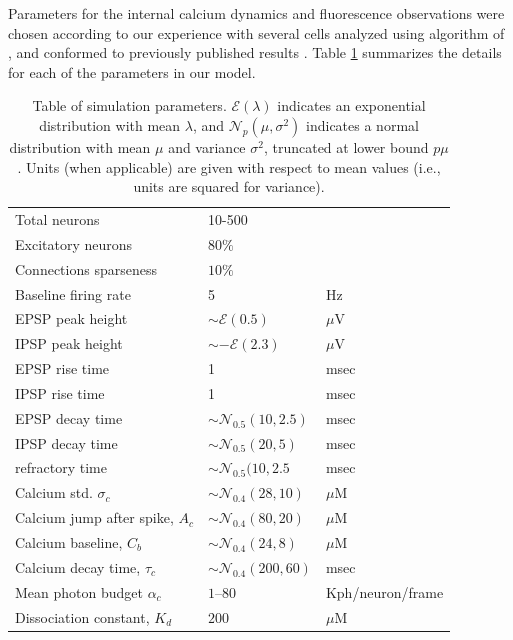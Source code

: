 Parameters for the internal calcium dynamics and fluorescence observations were chosen according to our experience with several cells analyzed using algorithm of \cite{Vogelstein2009}, and conformed to previously published results \cite{ImagingManual,HelmchenSakmann96,BrenowitzRegehr07}. %
Table \ref{table:caparm} summarizes the details for each of the parameters in our model.

\begin{table}[h!b!p!]
\caption{Table of simulation parameters. $\mathcal{E}(\lambda)$ indicates an exponential distribution with mean $\lambda$, and $\mathcal{N}_p(\mu,\sigma^2)$ indicates a normal distribution with mean $\mu$ and variance $\sigma^2$, truncated at lower bound $p\mu$.  Units (when applicable) are given with respect to mean values (i.e., units are squared for variance).}\label{table:caparm}

\begin{tabular}{lll}
\hline
Total neurons & 10-500 \\
Excitatory neurons & $80\%$ \\
Connections sparseness & $10\%$ \\
Baseline firing rate & 5 & Hz\\
\hline
EPSP peak height 	& $\sim \mathcal{E}(0.5)$ & $\mu$V \\
IPSP peak height 	& $\sim -\mathcal{E}(2.3)$ & $\mu$V \\
EPSP rise time 		& 1 & msec \\
IPSP rise time 		& 1 & msec \\
EPSP decay time 	& $\sim \mathcal{N}_{0.5}(10,2.5)$ & msec \\
IPSP decay time 	& $\sim \mathcal{N}_{0.5}(20,5)$ & msec\\
refractory time 	& $\sim \mathcal{N}_{0.5}(10,2.5$ & msec \\
\hline
Calcium std. $\sigma_c$ & $\sim \mathcal{N}_{0.4}(28,10)$ & $\mu$M\\
Calcium jump after spike, $A_c$ &  $\sim \mathcal{N}_{0.4}(80,20)$ & $\mu$M\\
Calcium baseline, $C_b$ & $\sim \mathcal{N}_{0.4}(24,8)$ & $\mu$M\\
Calcium decay time, $\tau_c$ & $\sim \mathcal{N}_{0.4}(200,60)$ & msec\\
Mean photon budget $\alpha_c$ & $1$--$80$ & Kph/neuron/frame \\
Dissociation constant, $K_d$ & $200$ & $\mu$M \\
\hline
\end{tabular}
\end{table}